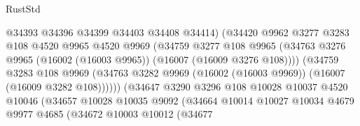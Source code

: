 \begin{lexlean}{RustStd}
\begin{coremodule}
                                      @34393
                                      @34396
                                      @34399
                                      @34403
                                      @34408
                                      @34414)
                                    (@34420
                                      @9962
                                      @3277
                                      @3283
                                      @108
                                      @4520
                                      @9965
                                      @4520
                                      @9969
                                      (@34759
                                        @3277
                                        @108
                                        @9965
                                        (@34763
                                          @3276
                                          @9965
                                          (@16002 (@16003 @9965))
                                          (@16007 (@16009 @3276 @108))))
                                      (@34759
                                        @3283
                                        @108
                                        @9969
                                        (@34763
                                          @3282
                                          @9969
                                          (@16002 (@16003 @9969))
                                          (@16007 (@16009 @3282 @108))))))
                                  (@34647
                                    @3290
                                    @3296
                                    @108
                                    @10028
                                    @10037
                                    @4520
                                    @10046
                                    (@34657
                                      @10028
                                      @10035
                                      @9092
                                      (@34664
                                        @10014
                                        @10027
                                        @10034
                                        @4679
                                        @9977
                                        @4685
                                        (@34672
                                          @10003
                                          @10012
                                          (@34677

\end{coremodule}
\end{lexlean}
